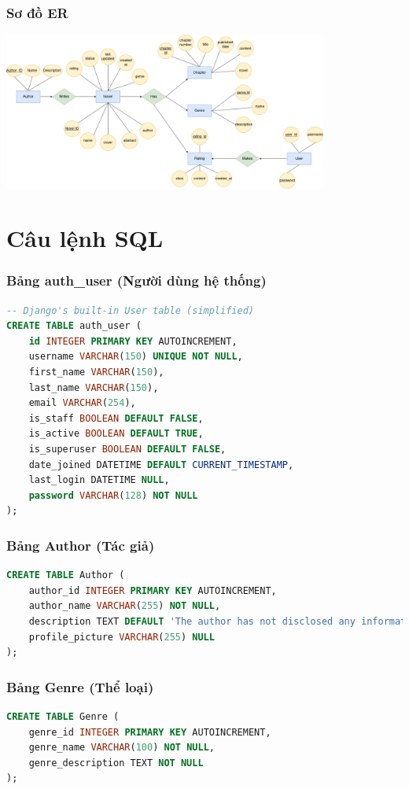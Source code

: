 \documentclass[12pt,aspectratio=169,handout]{beamer}
\begin{document}
\begin{frame}
    \frametitle{Sơ đồ ER}
    \begin{center}
        \includegraphics[width=0.8\textwidth]{img/ER.png}
    \end{center}
\end{frame}

\section{Câu lệnh SQL}

\begin{frame}[fragile]
\frametitle{Bảng auth\_user (Người dùng hệ thống)}
\begin{lstlisting}[language=SQL, basicstyle=\small\ttfamily]
-- Django's built-in User table (simplified)
CREATE TABLE auth_user (
    id INTEGER PRIMARY KEY AUTOINCREMENT,
    username VARCHAR(150) UNIQUE NOT NULL,
    first_name VARCHAR(150),
    last_name VARCHAR(150),
    email VARCHAR(254),
    is_staff BOOLEAN DEFAULT FALSE,
    is_active BOOLEAN DEFAULT TRUE,
    is_superuser BOOLEAN DEFAULT FALSE,
    date_joined DATETIME DEFAULT CURRENT_TIMESTAMP,
    last_login DATETIME NULL,
    password VARCHAR(128) NOT NULL
);
\end{lstlisting}
\end{frame}

\begin{frame}[fragile]
\frametitle{Bảng Author (Tác giả)}
\begin{lstlisting}[language=SQL, basicstyle=\small\ttfamily]
CREATE TABLE Author (
    author_id INTEGER PRIMARY KEY AUTOINCREMENT,
    author_name VARCHAR(255) NOT NULL,
    description TEXT DEFAULT 'The author has not disclosed any information about themselves.',
    profile_picture VARCHAR(255) NULL
);
\end{lstlisting}
\end{frame}

\begin{frame}[fragile]
\frametitle{Bảng Genre (Thể loại)}
\begin{lstlisting}[language=SQL, basicstyle=\small\ttfamily]
CREATE TABLE Genre (
    genre_id INTEGER PRIMARY KEY AUTOINCREMENT,
    genre_name VARCHAR(100) NOT NULL,
    genre_description TEXT NOT NULL
);
\end{lstlisting}
\end{frame}
\end{document}
